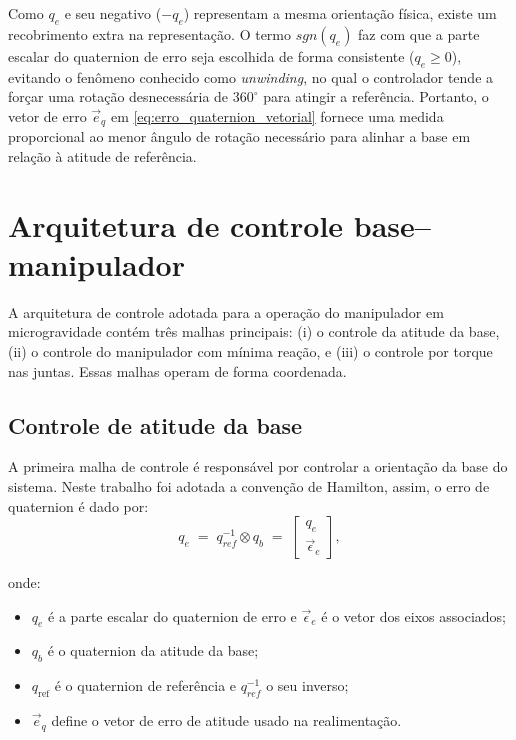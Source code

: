 Como $q_e$ e seu negativo ($-q_e$) representam a mesma orientação física, existe um recobrimento extra na representação.
O termo $sgn(q_{e})$ faz com que a parte escalar do quaternion de erro seja escolhida de forma consistente ($q_{e}\ge 0$), evitando o fenômeno conhecido como \emph{unwinding}, no qual o controlador tende a forçar uma rotação desnecessária de $360^{\circ}$ para atingir a referência.
Portanto, o vetor de erro $\vec e_q$ em \eqref{eq:erro_quaternion_vetorial} fornece uma medida proporcional ao menor ângulo de rotação necessário para alinhar a base em relação à atitude de referência.



\section{Arquitetura de controle base--manipulador}
A arquitetura de controle adotada para a operação do manipulador em microgravidade contém três malhas principais: (i) o controle da atitude da base, (ii) o controle do manipulador com mínima reação, e (iii) o controle por torque nas juntas. Essas malhas operam de forma coordenada.

\subsection{Controle de atitude da base}
A primeira malha de controle é responsável por controlar a orientação da base do sistema.
Neste trabalho foi adotada a convenção de Hamilton, assim, o erro de quaternion é dado por:
\begin{equation}
    q_e \;=\; q_{ref}^{-1} \otimes q_b \;=\;
    \begin{bmatrix}
        q_{e} \\[2pt] \vec {\epsilon}_e
    \end{bmatrix},
    \label{eq:erro_quaternion1}
\end{equation}

onde:
\begin{itemize}
    \item $q_{e}$ é a parte escalar do quaternion de erro e $\vec {\epsilon}_e$ é o vetor dos eixos associados;
    \item $q_b$ é o quaternion da atitude da base;
    \item $q_{\mathrm{ref}}$ é o quaternion de referência e $q_{ref}^{-1}$ o seu inverso;
    \item $\vec e_q$ define o vetor de erro de atitude usado na realimentação.
\end{itemize}


